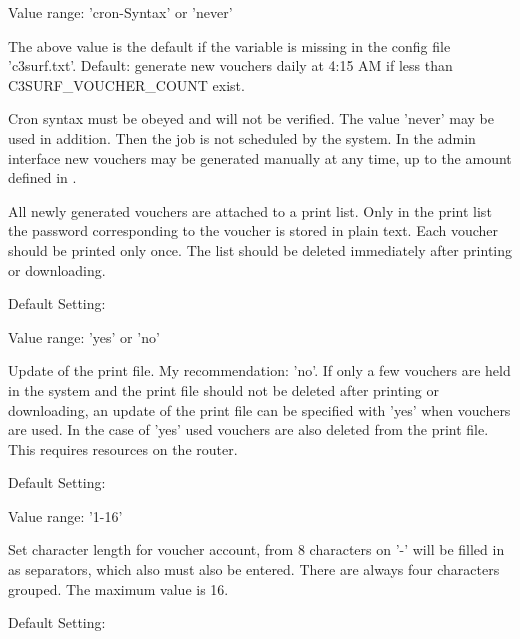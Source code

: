 \begin{description}


  Value range: 'cron-Syntax' or 'never'

  The above value is the default if the variable is missing in the config file 'c3surf.txt'.
  Default: generate new vouchers daily at 4:15 AM if less than\\ C3SURF\_VOUCHER\_COUNT exist.

  Cron syntax must be obeyed and will not be verified. The value 'never' may be used in addition.
  Then the job is not scheduled by the system. In the admin interface new vouchers may be generated
  manually at any time, up to the amount defined in .

  All newly generated vouchers are attached to a print list. Only in the print list the password
  corresponding to the voucher is stored in plain text. Each voucher should be printed only once.
  The list should be deleted immediately after printing or downloading.


  Default Setting: 

  Value range: 'yes' or 'no'

  Update of the print file. My recommendation: 'no'. If only a few vouchers are held in the system and
  the print file should not be deleted after printing or downloading, an update of the print file can be
  specified with 'yes' when vouchers are used. In the case of 'yes' used vouchers are also deleted from
  the print file. This requires resources on the router.


  Default Setting: 

  Value range: '1-16'

  Set character length for voucher account, from 8 characters on '-' will be filled in as separators,
  which also must also be entered. There are always four characters grouped. The maximum value is 16.


  Default Setting: 


\end{description}
